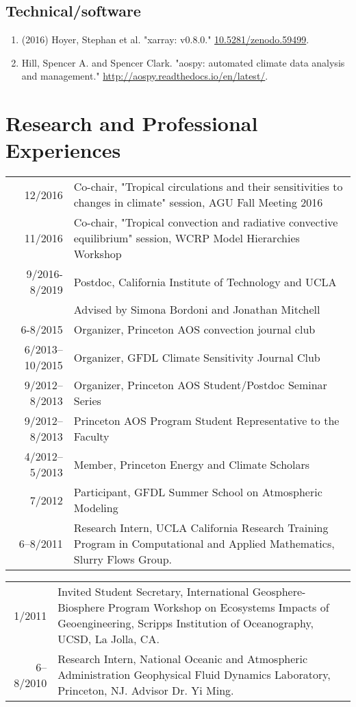 \documentclass[12pt,letterpaper]{shillcv}
\begin{document}
\subsection*{Technical/software}
\label{sec:org62c49a2}
\begin{enumerate}
\item (2016) Hoyer, Stephan et al.  "xarray: v0.8.0."  \href{https://doi.org/10.5281/zenodo.59499}{10.5281/zenodo.59499}.
\item Hill, Spencer A. and Spencer Clark.  "aospy: automated climate data analysis
and management."  \url{http://aospy.readthedocs.io/en/latest/}.
\end{enumerate}
\section*{Research and Professional Experiences}
\label{sec:orgf0bb09a}
\begin{center}
\begin{tabularx}{\textwidth}{rX}
12/2016 & Co-chair, "Tropical circulations and their sensitivities to changes in climate" session, AGU Fall Meeting 2016\\
11/2016 & Co-chair, "Tropical convection and radiative convective equilibrium" session, WCRP Model Hierarchies Workshop\\
9/2016-8/2019 & Postdoc, California Institute of Technology and UCLA\\
 & Advised by Simona Bordoni and Jonathan Mitchell\\
6-8/2015 & Organizer, Princeton AOS convection journal club\\
6/2013–10/2015 & Organizer, GFDL Climate Sensitivity Journal Club\\
9/2012–8/2013 & Organizer, Princeton AOS Student/Postdoc Seminar Series\\
9/2012–8/2013 & Princeton AOS Program Student Representative to the Faculty\\
4/2012–5/2013 & Member, Princeton Energy and Climate Scholars\\
7/2012 & Participant, GFDL Summer School on Atmospheric Modeling\\
6–8/2011 & Research Intern, UCLA California Research Training Program in Computational and Applied Mathematics, Slurry Flows Group.\\
\end{tabularx}
\end{center}

\begin{center}
\begin{tabularx}{\textwidth}{rX}
1/2011 & Invited Student Secretary, International Geosphere-Biosphere Program Workshop on Ecosystems Impacts of Geoengineering, Scripps Institution of Oceanography, UCSD, La Jolla, CA.\\
6–8/2010 & Research Intern, National Oceanic and Atmospheric Administration Geophysical Fluid Dynamics Laboratory, Princeton, NJ. Advisor Dr. Yi Ming.\\
\end{tabularx}
\end{center}
\end{document}
